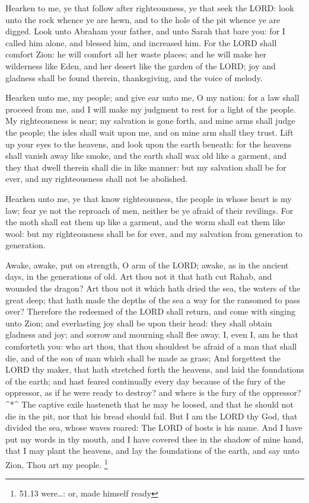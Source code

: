  Hearken to me, ye that follow after righteousness, ye that
seek the LORD: look unto the rock whence ye are hewn, and to the hole of
the pit whence ye are digged.  Look unto Abraham your
father, and unto Sarah that bare you: for I called him alone, and
blessed him, and increased him.  For the LORD shall comfort
Zion: he will comfort all her waste places; and he will make her
wilderness like Eden, and her desert like the garden of the LORD; joy
and gladness shall be found therein, thanksgiving, and the voice of
melody.

 Hearken unto me, my people; and give ear unto me, O my
nation: for a law shall proceed from me, and I will make my judgment to
rest for a light of the people.  My righteousness is near;
my salvation is gone forth, and mine arms shall judge the people; the
isles shall wait upon me, and on mine arm shall they trust. 
Lift up your eyes to the heavens, and look upon the earth beneath: for
the heavens shall vanish away like smoke, and the earth shall wax old
like a garment, and they that dwell therein shall die in like manner:
but my salvation shall be for ever, and my righteousness shall not be
abolished.

 Hearken unto me, ye that know righteousness, the people in
whose heart is my law; fear ye not the reproach of men, neither be ye
afraid of their revilings.  For the moth shall eat them up
like a garment, and the worm shall eat them like wool: but my
righteousness shall be for ever, and my salvation from generation to
generation.

 Awake, awake, put on strength, O arm of the LORD; awake, as
in the ancient days, in the generations of old. Art thou not it that
hath cut Rahab, and wounded the dragon?  Art thou not it
which hath dried the sea, the waters of the great deep; that hath made
the depths of the sea a way for the ransomed to pass over? 
Therefore the redeemed of the LORD shall return, and come with singing
unto Zion; and everlasting joy shall be upon their head: they shall
obtain gladness and joy; and sorrow and mourning shall flee away.
 I, even I, am he that comforteth you: who art thou, that
thou shouldest be afraid of a man that shall die, and of the son of man
which shall be made as grass;  And forgettest the LORD thy
maker, that hath stretched forth the heavens, and laid the foundations
of the earth; and hast feared continually every day because of the fury
of the oppressor, as if he were ready to destroy? and where is the fury
of the oppressor?\^{}*\^{}  The captive exile hasteneth
that he may be loosed, and that he should not die in the pit, nor that
his bread should fail.  But I am the LORD thy God, that
divided the sea, whose waves roared: The LORD of hosts is his name.
 And I have put my words in thy mouth, and I have covered
thee in the shadow of mine hand, that I may plant the heavens, and lay
the foundations of the earth, and say unto Zion, Thou art my people.
\footnote{51.13 were\ldots: or, made himself ready}

